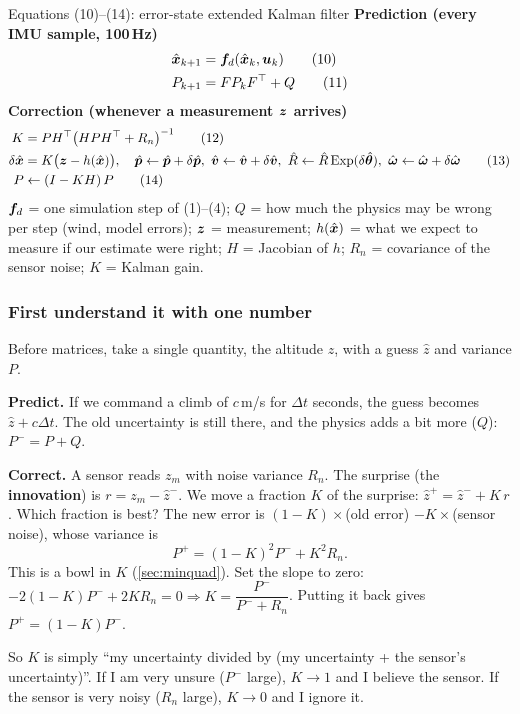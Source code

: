 \begin{eqbox}{Equations (10)--(14): error-state extended Kalman filter}
\textbf{Prediction (every IMU sample, 100\,Hz)}
\begin{align}
  \hat{\bm x}_{k+1} &= \bm{f}_d(\hat{\bm x}_k,\bm{u}_k) \tag{10}\label{eq:10}\\
  P_{k+1}   &= F P_k F^\top + Q \tag{11}\label{eq:11}
\end{align}
\textbf{Correction (whenever a measurement $\bm{z}$ arrives)}
\begin{align}
  K   &= P H^\top\big(HPH^\top+R_n\big)^{-1} \tag{12}\label{eq:12}\\
  \delta\hat{\vx} &= K\big(\vz-h(\hx)\big),\quad
  \hp\leftarrow\hp+\delta\hat{\vp},\ \hv\leftarrow\hv+\delta\hat{\vv},\ \hR\leftarrow\hR\,\Exp(\delta\hat{\vth}),\ \hw\leftarrow\hw+\delta\hat{\vw} \tag{13}\label{eq:13}\\
  P   &\leftarrow (I-KH)\,P \tag{14}\label{eq:14}
\end{align}
$\bm{f}_d$ = one simulation step of (1)--(4); $Q$ = how much the physics may be wrong per step (wind, model errors);
$\bm{z}$ = measurement; $h(\hat{\bm x})$ = what we expect to measure if our estimate were right; $H$ = Jacobian of $h$;
$R_n$ = covariance of the sensor noise; $K$ = Kalman gain.
\end{eqbox}

\subsubsection*{First understand it with one number}
Before matrices, take a single quantity, the altitude $z$, with a guess $\hat z$ and variance $P$.

\textbf{Predict.} If we command a climb of $c$\,m/s for $\Delta t$ seconds, the guess becomes $\hat z+c\Delta t$. The old
uncertainty is still there, and the physics adds a bit more ($Q$): $P^-=P+Q$.

\textbf{Correct.} A sensor reads $z_m$ with noise variance $R_n$. The surprise (the \textbf{innovation}) is
$r=z_m-\hat z^-$. We move a fraction $K$ of the surprise: $\hat z^+=\hat z^-+K\,r$. Which fraction is best? The new
error is $(1-K)\times$(old error) $-K\times$(sensor noise), whose variance is
\[
P^+=(1-K)^2P^-+K^2R_n .
\]
This is a bowl in $K$ (\cref{sec:minquad}). Set the slope to zero:
$-2(1-K)P^-+2KR_n=0\Rightarrow K=\dfrac{P^-}{P^-+R_n}$. Putting it back gives $P^+=(1-K)P^-$.

So $K$ is simply ``my uncertainty divided by (my uncertainty + the sensor's uncertainty)''. If I am very unsure
($P^-$ large), $K\to1$ and I believe the sensor. If the sensor is very noisy ($R_n$ large), $K\to0$ and I ignore it.

